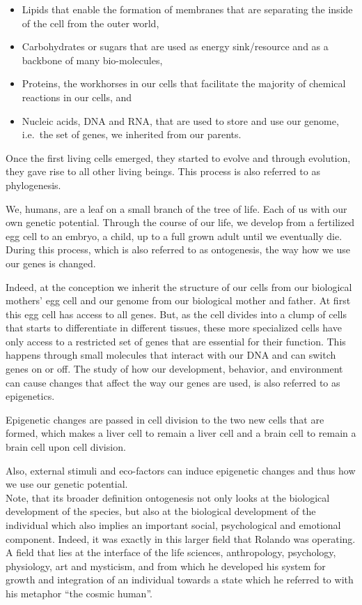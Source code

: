 \documentclass[
  11pt,
]{book}
\providecommand{\tightlist}{%
  \setlength{\itemsep}{0pt}\setlength{\parskip}{0pt}}
\begin{document}
\begin{itemize}
\tightlist
\item
  Lipids that enable the formation of membranes that are separating the inside of the cell from the outer world,
\item
  Carbohydrates or sugars that are used as energy sink/resource and as a backbone of many bio-molecules,
\item
  Proteins, the workhorses in our cells that facilitate the majority of chemical reactions in our cells, and
\item
  Nucleic acids, DNA and RNA, that are used to store and use our genome, i.e.~the set of genes, we inherited from our parents.
\end{itemize}

Once the first living cells emerged, they started to evolve and through evolution, they gave rise to all other living beings. This process is also referred to as phylogenesis.

We, humans, are a leaf on a small branch of the tree of life. Each of us with our own genetic potential. Through the course of our life, we develop from a fertilized egg cell to an embryo, a child, up to a full grown adult until we eventually die. During this process, which is also referred to as ontogenesis, the way how we use our genes is changed.

Indeed, at the conception we inherit the structure of our cells from our biological mothers' egg cell and our genome from our biological mother and father. At first this egg cell has access to all genes. But, as the cell divides into a clump of cells that starts to differentiate in different tissues, these more specialized cells have only access to a restricted set of genes that are essential for their function. This happens through small molecules that interact with our DNA and can switch genes on or off.
The study of how our development, behavior, and environment can cause changes that affect the way our genes are used, is also referred to as epigenetics.

Epigenetic changes are passed in cell division to the two new cells that are formed, which makes a liver cell to remain a liver cell and a brain cell to remain a brain cell upon cell division.

Also, external stimuli and eco-factors can induce epigenetic changes and thus how we use our genetic potential.\\

Note, that its broader definition ontogenesis not only looks at the biological development of the species, but also at the biological development of the individual which also implies an important social, psychological and emotional component.
Indeed, it was exactly in this larger field that Rolando was operating. A field that lies at the interface of the life sciences, anthropology, psychology, physiology, art and mysticism, and from which he developed his system for growth and integration of an individual towards a state which he referred to with his metaphor ``the cosmic human''.
\end{document}
